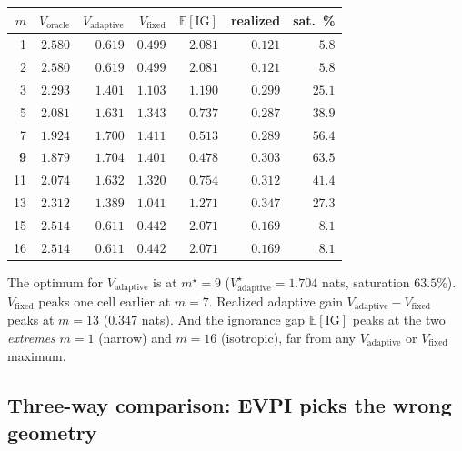 \documentclass[11pt,a4paper,onecolumn]{article}
\newcommand{\E}{\mathbb{E}}
\begin{document}
\begin{center}
\begin{tabular}{@{}rrrrrrr@{}}
\toprule
$m$ & $V_{\text{oracle}}$ & $V_{\text{adaptive}}$ & $V_{\text{fixed}}$ & $\E[\mathrm{IG}]$ & realized & sat.\ \% \\
\midrule
 1 & $2.580$ & $0.619$ & $0.499$ & $\mathbf{2.081}$ & $0.121$ & $5.8$  \\
 2 & $2.580$ & $0.619$ & $0.499$ & $2.081$ & $0.121$ & $5.8$  \\
 3 & $2.293$ & $1.401$ & $1.103$ & $1.190$ & $0.299$ & $25.1$ \\
 5 & $2.081$ & $1.631$ & $1.343$ & $0.737$ & $0.287$ & $38.9$ \\
 7 & $1.924$ & $1.700$ & $\mathbf{1.411}$ & $0.513$ & $0.289$ & $56.4$ \\
\textbf{9} & $1.879$ & $\mathbf{1.704}$ & $1.401$ & $0.478$ & $\mathbf{0.303}$ & $\mathbf{63.5}$ \\
11 & $2.074$ & $1.632$ & $1.320$ & $0.754$ & $0.312$ & $41.4$ \\
13 & $2.312$ & $1.389$ & $1.041$ & $1.271$ & $0.347$ & $27.3$ \\
15 & $2.514$ & $0.611$ & $0.442$ & $2.071$ & $0.169$ & $8.1$  \\
16 & $2.514$ & $0.611$ & $0.442$ & $2.071$ & $0.169$ & $8.1$  \\
\bottomrule
\end{tabular}
\end{center}

The optimum for $V_{\text{adaptive}}$ is at $m^\star = 9$ ($V_{\text{adaptive}}^\star = 1.704$ nats, saturation $63.5\%$).  $V_{\text{fixed}}$ peaks one cell earlier at $m = 7$.  Realized adaptive gain $V_{\text{adaptive}} - V_{\text{fixed}}$ peaks at $m = 13$ ($0.347$ nats).  And the ignorance gap $\E[\mathrm{IG}]$ peaks at the two \emph{extremes} $m = 1$ (narrow) and $m = 16$ (isotropic), far from any $V_{\text{adaptive}}$ or $V_{\text{fixed}}$ maximum.

\subsection{Three-way comparison: EVPI picks the wrong geometry}
\end{document}
